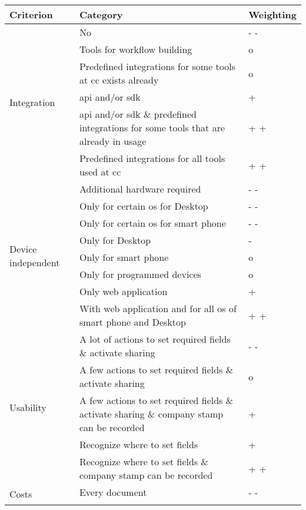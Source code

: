 	\begin{longtable}{|p{4cm}|p{9cm}|p{1.5cm}|} \hline
		Criterion & Category & Weighting \\ \hline
		\multirow{6}{*}{Integration} & No & - - \\ \cline{2-3}
									& Tools for workflow building & o \\ \cline{2-3}
									& Predefined integrations for some tools at \gls{cc} exists already & o \\ \cline{2-3}
									& \Gls{api} and/or \gls{sdk} & + \\ \cline{2-3}
									& \Gls{api} and/or \gls{sdk} \& predefined integrations for some tools that are already in usage & + + \\ \cline{2-3}
									& Predefined integrations for all tools used at \gls{cc} & + + \\ \hline 
		\multirow{8}{*}{Device independent} & Additional hardware required & - - \\ \cline{2-3}
											& Only for certain \gls{os} for Desktop & - - \\ \cline{2-3}
											& Only for certain \gls{os} for smart phone & - - \\ \cline{2-3} 
											& Only for Desktop & - \\ \cline{2-3}
											& Only for smart phone & o \\ \cline{2-3}
											& Only for programmed devices & o \\ \cline{2-3}
											& Only web application & + \\ \cline{2-3}
											& With web application and for all \gls{os} of smart phone and Desktop & + + \\ \hline
		\multirow{5}{*}{Usability} & A lot of actions to set required fields \& activate sharing & - - \\ \cline{2-3}
								    & A few actions to set required fields \& activate sharing & o \\ \cline{2-3}
									& A few actions to set required fields \& activate sharing \& company stamp can be recorded & + \\ \cline{2-3}
									& Recognize where to set fields & + \\ \cline{2-3}
									& Recognize where to set fields \& company stamp can be recorded & + + \\ \hline
		\multirow{5}{*}{Costs}  & Every document & - - \\ \cline{2-3}

\end{longtable}
